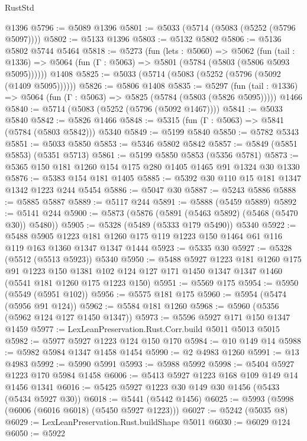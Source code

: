 \begin{lexlean}{RustStd}
\begin{coremodule}
    @1396
@5796 := @5089 @1396
@5801 := @5033 (@5714 (@5083 (@5252 (@5796 @5097))))
@5802 := @5133 @1396
@5803 := @5132 @5802
@5806 := @5136 @5802 @5744 @5464
@5818 := @5273
    (fun (lets : @5060) =>
    @5062
      (fun (tail : @1336) => @5064 (fun (Γ : @5063) => @5801 (@5784 (@5803 (@5806 @5093 @5095))))))
    @1408
@5825 := @5033 (@5714 (@5083 (@5252 (@5796 (@5092 (@1409 @5095))))))
@5826 := @5806 @1408
@5835 := @5297
    (fun (tail : @1336) => @5064 (fun (Γ : @5063) => @5825 (@5784 (@5803 (@5826 @5095)))))
    @1466
@5840 := @5714 (@5083 (@5252 (@5796 (@5092 @1467))))
@5841 := @5033 @5840
@5842 := @5826 @1466
@5848 := @5315 (fun (Γ : @5063) => @5841 (@5784 (@5803 @5842))) @5340
@5849 := @5199 @5840
@5850 := @5782 @5343
@5851 := @5033 @5850
@5853 := @5346 @5802 @5842
@5857 := @5849 (@5851 @5853) (@5351 @5713)
@5861 := @5199 @5850 @5853 (@5356 @5781)
@5873 := @5365 @150 @181 @1260 @154 @175 @280 @1405 @1465 @91 @1324 @30 @1330
@5876 := @5383 @154 @181 @1405
@5885 := @5392 @30 @110 @15 @181 @1347 @1342 @1223 @244 @5454
@5886 := @5047 @30
@5887 := @5243 @5886
@5888 := @5885 @5887
@5889 := @5117 @244
@5891 := @5888 (@5459 @5889)
@5892 := @5141 @244
@5900 := @5873 (@5876 (@5891 (@5463 @5892) (@5468 (@5470 @30)) @5480))
@5905 := @5328 (@5489 (@5333 @179 @5490)) @5340
@5922 := @5488
    @5905
    @1223
    @181
    @1260
    @175
    @119
    @1223
    @150
    @1464
    @61
    @116
    @119
    @163
    @1360
    @1347
    @1347
    @1444
@5923 := @5335 @30
@5927 := @5328 (@5512 (@5513 @5923)) @5340
@5950 := @5488
    @5927
    @1223
    @181
    @1260
    @175
    @91
    @1223
    @150
    @1381
    @102
    @124
    @127
    @171
    @1450
    @1347
    @1347
    @1460
    (@5541 @181 @1260 @175 @1223 @150)
@5951 := @5569 @175
@5954 := @5950 (@5549 (@5951 @102))
@5956 := @5575 @181 @175
@5960 := @5954 (@5474 (@5956 @91 @124))
@5962 := @5584 @181 @1260
@5968 := @5960 (@5356 (@5962 @124 @127 @1450 @1347))
@5973 := @5596 @5927 @171 @150 @1347 @1459
@5977 := LexLeanPreservation.Rust.Corr.build @5011 @5013 @5015
@5982 := @5977 @5927 @1223 @124 @150 @170
@5984 := @10 @149 @14
@5988 := @5982 @5984 @1347 @1458 @1454
@5990 := @2 @4983 @1260
@5991 := @13 @4983
@5992 := @5990 @5991
@5993 := @5988 @5992
@5998 := @5404 @5927 @1223 @170 @5984 @1458
@6006 := @5413 @5927 @1223 @168 @109 @149 @14 @1456 @1341
@6016 := @5425 @5927 @1223 @30 @149 @30 @1456 (@5433 (@5434 @5927 @30))
@6018 := @5441 (@5442 @1456)
@6025 := @5993 (@5998 (@6006 (@6016 @6018) (@5450 @5927 @1223)))
@6027 := @5242 (@5035 @8)
@6029 := LexLeanPreservation.Rust.buildShape @5011
@6030 := @6029 @124
@6050 := @5922

\end{coremodule}
\end{lexlean}

